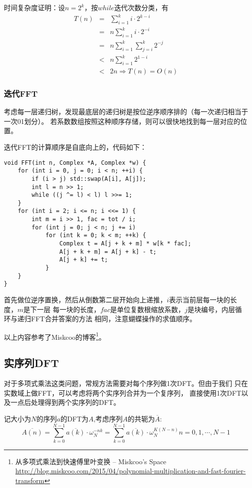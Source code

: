 时间复杂度证明：设$n=2^k$，按$while$迭代次数分类，有
\begin{eqnarray*}
	T(n)&=&\sum_{i=1}^k{i\cdot 2^{k-i}}\\
	&=&n\sum_{i=1}^k{i\cdot 2^{-i}}\\
	&=&n\sum_{i=1}^k{\sum_{j=i}^k{2^{-j}}}\\
	&<&n\sum_{i=1}^k{2^{1-i}}\\
	&<&2n\Rightarrow T(n)=O(n)
\end{eqnarray*}
\subsubsection{迭代FFT}
考虑每一层递归树，发现最底层的递归树是按位逆序顺序排的（每一次递归相当于一次01划分）。
若系数数组按照这种顺序存储，则可以很快地找到每一层对应的位置。

迭代FFT的计算顺序是自底向上的，代码如下：

\begin{lstlisting}
void FFT(int n, Complex *A, Complex *w) {
    for (int i = 0, j = 0; i < n; ++i) {
        if (i > j) std::swap(A[i], A[j]);
        int l = n >> 1;
        while ((j ^= l) < l) l >>= 1;
    }
    for (int i = 2; i <= n; i <<= 1) {
        int m = i >> 1, fac = tot / i;
        for (int j = 0; j < n; j += i)
            for (int k = 0; k < m; ++k) {
                Complex t = A[j + k + m] * w[k * fac];
                A[j + k + m] = A[j + k] - t;
                A[j + k] += t;
            }
    }
}
\end{lstlisting}
首先做位逆序置换，然后从倒数第二层开始向上递推，$i$表示当前层每一块的长度，$m$是下一层
每一块的长度，$fac$是单位复数根缩放系数，$j$是块编号，内层循环与递归FFT合并答案的方法
相同，注意蝴蝶操作的求值顺序。

以上内容参考了Miskcoo的博客\footnote{从多项式乘法到快速傅里叶变换 – Miskcoo's Space\\
\url{http://blog.miskcoo.com/2015/04/polynomial-multiplication-and-fast-fourier-transform}}。
\subsection{实序列DFT}\label{RDFT}
对于多项式乘法这类问题，常规方法需要对每个序列做1次DFT。但由于我们
只在实数域上做FFT，可以考虑将两个实序列合并为一个复序列，
直接使用1次DFT以及一点后处理得到两个实序列的DFT。

记大小为$N$的序列$a$的DFT为$A$,考虑序列$A$的共轭为$\overline{A}$:
\begin{displaymath}
	\overline{A(n)}=\sum_{k=0}^{N-1}{\overline{a(k)}\cdot\omega_N^{-nk}}=
	\sum_{k=0}^{N-1}{\overline{a(k)}\cdot\omega_N^{K(N-n)}}
	n=0,1,\cdots,N-1
\end{displaymath}


